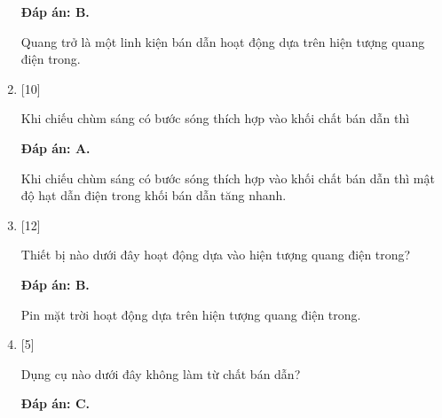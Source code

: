 \begin{enumerate}[label=\bfseries Câu \arabic*:]
	\loigiai
	{		\textbf{Đáp án: B.}
		
		Quang trở là một linh kiện bán dẫn hoạt động dựa trên hiện tượng quang điện trong.
	}
	
	\item {} [10]
	\cauhoi
	{Khi chiếu chùm sáng có bước sóng thích hợp vào khối chất bán dẫn thì
	}
	
	\loigiai
	{		\textbf{Đáp án: A.}
		
		Khi chiếu chùm sáng có bước sóng thích hợp vào khối chất bán dẫn thì mật độ hạt dẫn điện trong khối bán dẫn tăng nhanh. 
	}
	
	\item {} [12]
	\cauhoi
	{Thiết bị nào dưới đây hoạt động dựa vào hiện tượng quang điện trong? 
	}
	
	\loigiai
	{		\textbf{Đáp án: B.}
		
		Pin mặt trời hoạt động dựa trên hiện tượng quang điện trong.
	}
	
	\item {} [5]
	\cauhoi
	{Dụng cụ nào dưới đây không làm từ chất bán dẫn?
	}
	
	\loigiai
	{		\textbf{Đáp án: C.}
		
}
\end{enumerate}

